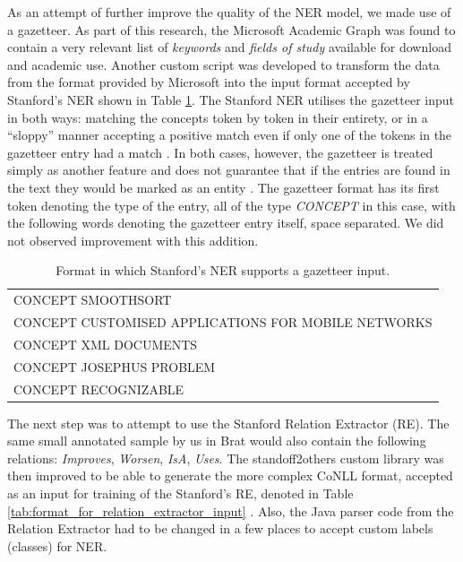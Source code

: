 \documentclass[11pt,a4paper,openright]{memoir}
\begin{document}
As an attempt of further improve the quality of the NER model, we made use of a gazetteer. As part of this research, the Microsoft Academic Graph \cite{microsoft-academic-data} was found to contain a very relevant list of \emph{keywords} and \emph{fields of study} available for download and academic use. Another custom script was developed to transform the data from the format provided by Microsoft into the input format accepted by Stanford's NER shown in Table \ref{tab:concept_list_from_gazetteer}. The Stanford NER utilises the gazetteer input in both ways: matching the concepts token by token in their entirety, or in a \enquote{sloppy} manner accepting a positive match even if only one of the tokens in the gazetteer entry had a match \cite{Finkel:2005:INI:1219840.1219885}. In both cases, however, the gazetteer is treated simply as another feature and does not guarantee that if the entries are found in the text they would be marked as an entity \cite{Finkel:2005:INI:1219840.1219885}. The gazetteer format has its first token denoting the type of the entry, all of the type \emph{CONCEPT} in this case, with the following words denoting the gazetteer entry itself, space separated. We did not observed improvement with this addition.

\begin{table}[!htbp]
  \centering
    \begin{tabular}{l}
CONCEPT SMOOTHSORT \\
CONCEPT CUSTOMISED APPLICATIONS FOR MOBILE NETWORKS \\
CONCEPT XML DOCUMENTS \\
CONCEPT JOSEPHUS PROBLEM \\
CONCEPT RECOGNIZABLE 
    \end{tabular}
  \caption[Format in which Stanford's NER supports a gazetteer input.]{Format in which Stanford's NER supports a gazetteer input.}
  \label{tab:concept_list_from_gazetteer}
\end{table}

The next step was to attempt to use the Stanford Relation Extractor (RE). The same small annotated sample by us in Brat would also contain the following relations: \emph{Improves}, \emph{Worsen}, \emph{IsA}, \emph{Uses}. The standoff2others custom library was then improved to be able to generate the more complex CoNLL format, accepted as an input for training of the Stanford's RE, denoted in Table \ref{tab:format_for_relation_extractor_input} \cite{Surdeanu:2011:CIE:2021153.2021155}. Also, the Java parser code from the Relation Extractor had to be changed in a few places to accept custom labels (classes) for NER.
\end{document}
